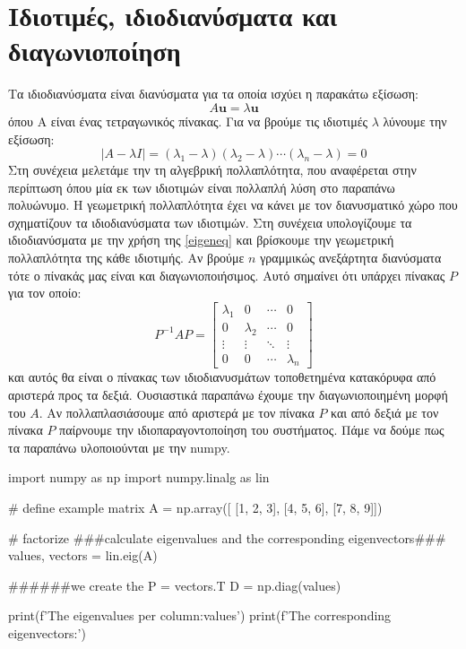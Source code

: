 \chapter{Ιδιοτιμές, ιδιοδιανύσματα και διαγωνιοποίηση}
Τα ιδιοδιανύσματα είναι διανύσματα για τα οποία ισχύει η παρακάτω εξίσωση:
\begin{equation}
A \mathbf{u}=\lambda \mathbf{u}
\label{eigeneq}
\end{equation}
όπου Α είναι ένας τετραγωνικός πίνακας. Για να βρούμε τις ιδιοτιμές $\lambda$ λύνουμε την εξίσωση:
\begin{equation}
|A-\lambda I|=\left(\lambda_1-\lambda\right)\left(\lambda_2-\lambda\right) \cdots\left(\lambda_n-\lambda\right)=0
\end{equation}
Στη συνέχεια μελετάμε την τη αλγεβρική πολλαπλότητα, που αναφέρεται στην περίπτωση όπου μία εκ των ιδιοτιμών είναι πολλαπλή λύση στο παραπάνω πολυώνυμο. Η γεωμετρική πολλαπλότητα έχει να κάνει με τον διανυσματικό χώρο που σχηματίζουν τα ιδιοδιανύσματα των ιδιοτιμών. Στη συνέχεια υπολογίζουμε τα ιδιοδιανύσματα  με την χρήση της \eqref{eigeneq} και βρίσκουμε την γεωμετρική πολλαπλότητα της κάθε ιδιοτιμής. Αν βρούμε $n$ γραμμικώς ανεξάρτητα διανύσματα
 τότε ο πίνακάς μας είναι και διαγωνιοποιήσιμος. Αυτό σημαίνει ότι υπάρχει πίνακας $P$ για τον οποίο:
\begin{equation}
P^{-1} A P=\left[\begin{array}{cccc}
\lambda_1 & 0 & \cdots & 0 \\
0 & \lambda_2 & \cdots & 0 \\
\vdots & \vdots & \ddots & \vdots \\
0 & 0 & \cdots & \lambda_n
\end{array}\right]
\label{eigendec}
\end{equation}
και αυτός θα είναι ο πίνακας των ιδιοδιανυσμάτων τοποθετημένα κατακόρυφα από αριστερά προς τα δεξιά. Ουσιαστικά παραπάνω έχουμε την διαγωνιοποιημένη μορφή του $A$. Αν πολλαπλασιάσουμε από αριστερά με τον πίνακα $P$ και από δεξιά με τον πίνακα $P$ παίρνουμε την ιδιοπαραγοντοποίηση του συστήματος. Πάμε να δούμε πως τα παραπάνω υλοποιούνται με την {\en numpy}. 
\en
\begin{python}
import numpy as np
import numpy.linalg as lin

# define example matrix
A = np.array([
[1, 2, 3],
[4, 5, 6],
[7, 8, 9]])

# factorize
###calculate eigenvalues and the corresponding eigenvectors###
values, vectors = lin.eig(A)

######we create the 
P = vectors.T
D = np.diag(values)

print(f'The eigenvalues per column:{values}')
print(f'The corresponding eigenvectors:')
\end{python}
